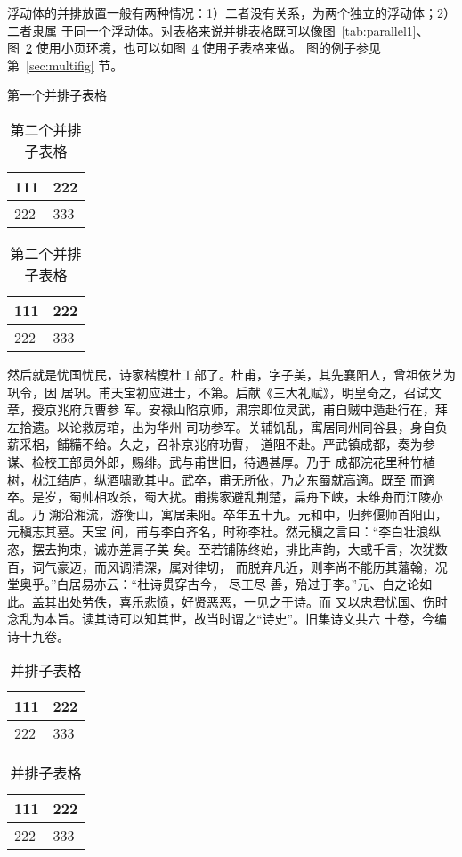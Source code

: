 浮动体的并排放置一般有两种情况：1）二者没有关系，为两个独立的浮动体；2）二者隶属
于同一个浮动体。对表格来说并排表格既可以像图~\ref{tab:parallel1}、
图~\ref{tab:parallel2} 使用小页环境，也可以如图~\ref{tab:subtable} 使用子表格来做。
图的例子参见第~\ref{sec:multifig} 节。

\begin{table}[htbp]
\noindent\begin{minipage}{0.5\textwidth}
\centering
\caption{第一个并排子表格}
\label{tab:parallel1}
\begin{tabular}{p{2cm}p{2cm}}
\toprule[1.5pt]
111 & 222 \\\midrule[1pt]
222 & 333 \\\bottomrule[1.5pt]
\end{tabular}
\end{minipage}%
\begin{minipage}{0.5\textwidth}
\centering
\caption{第二个并排子表格}
\label{tab:parallel2}
\begin{tabular}{p{2cm}p{2cm}}
\toprule[1.5pt]
111 & 222 \\\midrule[1pt]
222 & 333 \\\bottomrule[1.5pt]
\end{tabular}
\end{minipage}
\end{table}

然后就是忧国忧民，诗家楷模杜工部了。杜甫，字子美，其先襄阳人，曾祖依艺为巩令，因
居巩。甫天宝初应进士，不第。后献《三大礼赋》，明皇奇之，召试文章，授京兆府兵曹参
军。安禄山陷京师，肃宗即位灵武，甫自贼中遁赴行在，拜左拾遗。以论救房琯，出为华州
司功参军。关辅饥乱，寓居同州同谷县，身自负薪采梠，餔糒不给。久之，召补京兆府功曹，
道阻不赴。严武镇成都，奏为参谋、检校工部员外郎，赐绯。武与甫世旧，待遇甚厚。乃于
成都浣花里种竹植树，枕江结庐，纵酒啸歌其中。武卒，甫无所依，乃之东蜀就高適。既至
而適卒。是岁，蜀帅相攻杀，蜀大扰。甫携家避乱荆楚，扁舟下峡，未维舟而江陵亦乱。乃
溯沿湘流，游衡山，寓居耒阳。卒年五十九。元和中，归葬偃师首阳山，元稹志其墓。天宝
间，甫与李白齐名，时称李杜。然元稹之言曰：“李白壮浪纵恣，摆去拘束，诚亦差肩子美
矣。至若铺陈终始，排比声韵，大或千言，次犹数百，词气豪迈，而风调清深，属对律切，
而脱弃凡近，则李尚不能历其藩翰，况堂奥乎。”白居易亦云：“杜诗贯穿古今，  尽工尽
善，殆过于李。”元、白之论如此。盖其出处劳佚，喜乐悲愤，好贤恶恶，一见之于诗。而
又以忠君忧国、伤时念乱为本旨。读其诗可以知其世，故当时谓之“诗史”。旧集诗文共六
十卷，今编诗十九卷。

\begin{table}[htbp]
\centering
\caption{并排子表格}
\label{tab:subtable}
{
\begin{tabular}{p{2cm}p{2cm}}
\toprule[1.5pt]
111 & 222 \\\midrule[1pt]
222 & 333 \\\bottomrule[1.5pt]
\end{tabular}
}
\hskip2cm
{
\begin{tabular}{p{2cm}p{2cm}}
\toprule[1.5pt]
111 & 222 \\\midrule[1pt]
222 & 333 \\\bottomrule[1.5pt]
\end{tabular}
}
\end{table}

